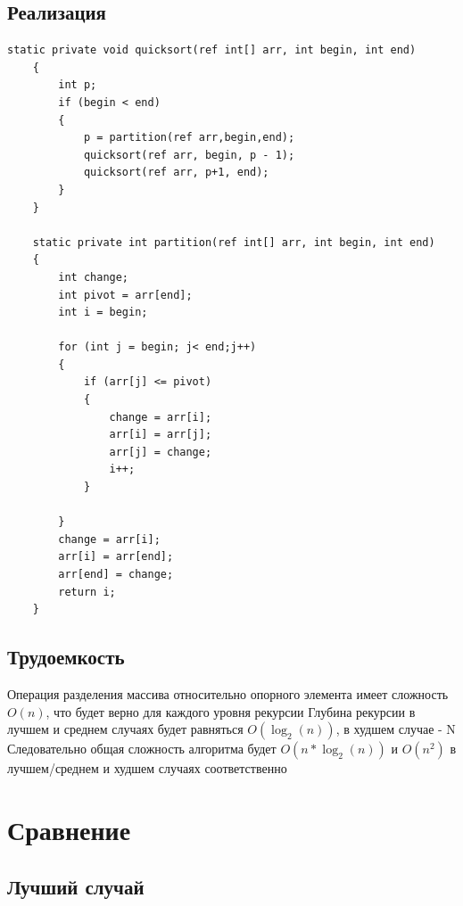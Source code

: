 \documentclass[a4paper,12pt]{article}
\begin{document}
	\subsection{Реализация}
	\begin{lstlisting}[label=some-code1,caption={Quicksort}]
	static private void quicksort(ref int[] arr, int begin, int end)
	{
		int p;
		if (begin < end)
		{
			p = partition(ref arr,begin,end);
			quicksort(ref arr, begin, p - 1);
			quicksort(ref arr, p+1, end);
		}
	}
	
	static private int partition(ref int[] arr, int begin, int end)
	{
		int change;
		int pivot = arr[end];
		int i = begin;
		
		for (int j = begin; j< end;j++)
		{
			if (arr[j] <= pivot)
			{
				change = arr[i];
				arr[i] = arr[j];
				arr[j] = change;
				i++;
			}
		
		}
		change = arr[i];
		arr[i] = arr[end];
		arr[end] = change;
		return i;
	}
	\end{lstlisting}
	\subsection{Трудоемкость}
	Операция разделения массива относительно опорного элемента имеет сложность $O(n)$,
	что будет верно для каждого уровня рекурсии
	Глубина рекурсии в лучшем и среднем случаях будет равняться $O(\log_2(n))$, в худшем
	случае - N
	Следовательно общая сложность алгоритма будет $O(n * \log_2(n))$ и $O(n^2)$ в лучшем/среднем и худшем случаях соответственно
\section{Сравнение}
	\subsection{Лучший случай}
\end{document}
